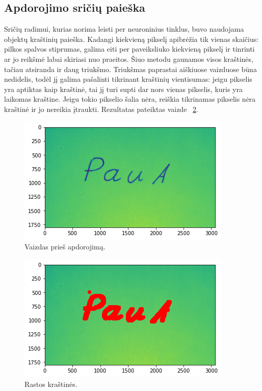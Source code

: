 \documentclass[conference]{IEEEtran}
\begin{document}
\subsection{Apdorojimo sričių paieška}


Sričių radimui, kurias norima leisti per neuroninius tinklus, buvo naudojama
objektų kraštinių paieška. Kadangi kiekvieną pikselį apibrėžia tik vienas skaičius:
pilkos spalvos stiprumas, galima eiti per paveiksliuko kiekvieną pikselį ir
tinrinti ar jo reikšmė labai skiriasi nuo praeitos. Šiuo metodu gaunamos visos kraštinės,
tačiau atsiranda ir daug triukšmo. Triukšmas paprastai aiškiuose vaizduose būna nedidelis, todėl
jį galima pašalinti tikrinant kraštinių vientisumas: jeigu pikselis yra aptiktas kaip kraštinė,
tai jį turi supti dar nors vienas pikselis, kuris yra laikomas kraštine. Jeigu tokio pikselio šalia nėra,
reiškia tikrinamas pikselis nėra kraštinė ir jo nereikia įtraukti. Rezultatas pateiktas vaizde ~\ref{fig3}.

\begin{figure}[!h] %
\centerline{\includegraphics[scale=0.4] {images/before.png}}
\caption{Vaizdas prieš apdorojimą.}
\label{fig2}
\end{figure}

\begin{figure}[!h] %
\centerline{\includegraphics[scale=0.4] {images/after.png}}
\caption{Rastos kraštinės.}
\label{fig3}
\end{figure}
\end{document}
